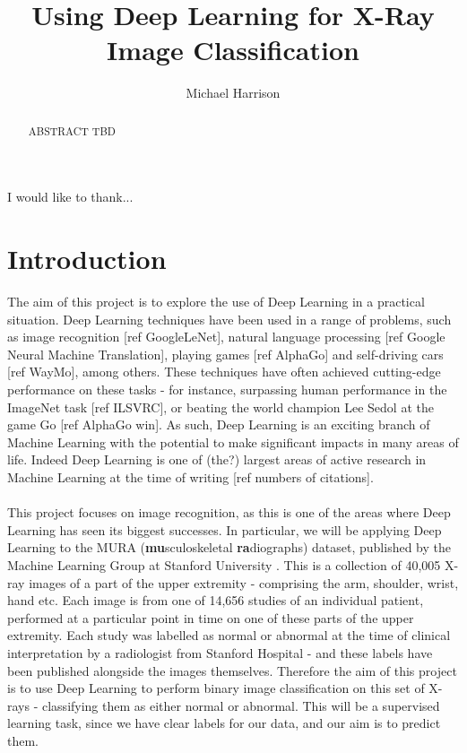 \documentclass[11pt]{article} %
\title{Using Deep Learning for X-Ray Image Classification}
\author{Michael Harrison}
\theoremstyle{plain}
\theoremstyle{definition}
\begin{document}
\maketitle

\declaration

\begin{acknowledgement}
I would like to thank...
\end{acknowledgement}

\begin{abstract}
ABSTRACT TBD
\end{abstract}


\newpage
\setcounter{page}{1}
\section{Introduction}
The aim of this project is to explore the use of Deep Learning in a practical situation. Deep Learning techniques have been used in a range of problems, such as image recognition [ref GoogleLeNet], natural language processing [ref Google Neural Machine Translation], playing games [ref AlphaGo] and self-driving cars [ref WayMo], among others. These techniques have often achieved cutting-edge performance on these tasks - for instance, surpassing human performance in the ImageNet task [ref ILSVRC], or beating the world champion Lee Sedol at the game Go [ref AlphaGo win]. As such, Deep Learning is an exciting branch of Machine Learning with the potential to make significant impacts in many areas of life. Indeed Deep Learning is one of (the?) largest areas of active research in Machine Learning at the time of writing [ref numbers of citations].
\\
\\
\noindent
This project focuses on image recognition, as this is one of the areas where Deep Learning has seen its biggest successes. In particular, we will be applying Deep Learning to the MURA (\textbf{mu}sculoskeletal \textbf{ra}diographs) dataset, published by the Machine Learning Group at Stanford University \cite{MURA2017}. This is a collection of 40,005 X-ray images of a part of the upper extremity - comprising the arm, shoulder, wrist, hand etc. Each image is from one of 14,656 studies of an individual patient, performed at a particular point in time on one of these parts of the upper extremity. Each study was labelled as normal or abnormal at the time of clinical interpretation by a radiologist from Stanford Hospital - and these labels have been published alongside the images themselves. Therefore the aim of this project is to use Deep Learning to perform binary image classification on this set of X-rays - classifying them as either normal or abnormal. This will be a supervised learning task, since we have clear labels for our data, and our aim is to predict them. 
\end{document}
